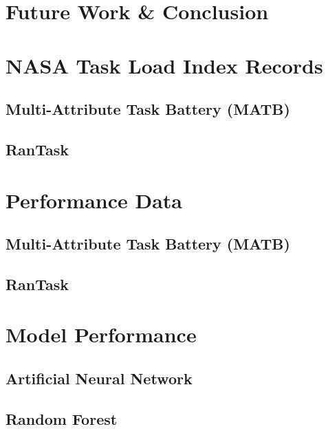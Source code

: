 \documentclass[11pt]{article}
\begin{document}
\section{Future Work \& Conclusion}



\newpage


\pagebreak
\begin{appendices}
\appendixpage
\noappendicestocpagenum
\addappheadtotoc
\section{NASA Task Load Index Records}
	\subsection{Multi-Attribute Task Battery (MATB)}
	\subsection{RanTask}
\section{Performance Data}
	\subsection{Multi-Attribute Task Battery (MATB)}
	\subsection{RanTask}
\section{Model Performance}
	\subsection{Artificial Neural Network}
	\subsection{Random Forest}
\end{appendices}	
\end{document}
